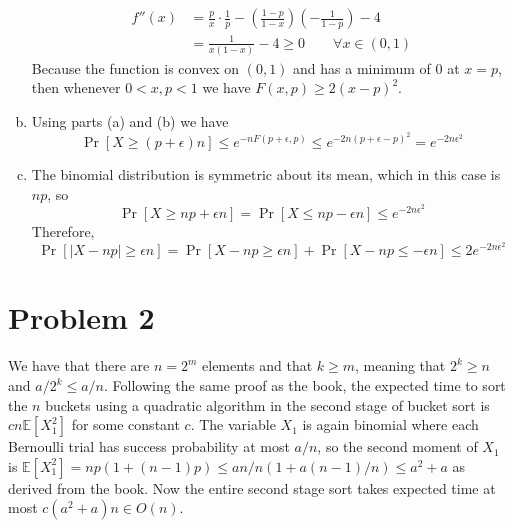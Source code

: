 \documentclass[11pt]{article}
\newcommand{\E}{\mathbb{E}}
\newcommand{\p}[1]{\left(#1\right)}
\newcommand{\BigOh}[1]{O\p{#1}}
\newcommand{\asdf}{\newline\newline}
\begin{document}
\begin{enumerate}[(a)]
\begin{align*}
f''(x) &= \frac px\cdot\frac1p - \left(\frac{1-p}{1-x}\right)\left(-\frac1{1-p}\right) -4\\
&= \frac1{x(1-x)}-4 \geq 0 \qquad \forall x\in (0,1)
\end{align*}
Because the function is convex on $(0,1)$ and has a minimum of $0$ at $x=p$, then whenever $0<x,p<1$ we have $F(x,p)\geq 2(x-p)^2$.
\item Using parts (a) and (b) we have $$\Pr[X\geq (p+\epsilon)n]\leq e^{-nF(p+\epsilon,p)}\leq e^{-2n(p+\epsilon-p)^2} = e^{-2n\epsilon^2}$$
\item The binomial distribution is symmetric about its mean, which in this case is $np$, so $$\Pr[X\geq np+\epsilon n]=\Pr[X\leq np-\epsilon n]\leq e^{-2n\epsilon^2}$$
Therefore, $$\Pr[|X-np|\geq\epsilon n]=\Pr[X-np\geq\epsilon n]+\Pr[X-np\leq -\epsilon n] \leq 2e^{-2n\epsilon^2}$$
\end{enumerate}


\newpage
\section*{Problem 2}
We have that there are $n=2^m$ elements and that $k\geq m$, meaning that $2^k\geq n$ and $a/2^k\leq a/n$. Following the same proof as the book, the expected time to sort the $n$ buckets using a quadratic algorithm in the second stage of bucket sort is $cn\E[X_1^2]$ for some constant $c$.\asdf
The variable $X_1$ is again binomial where each Bernoulli trial has success probability at most $a/n$, so the second moment of $X_1$ is $\E[X_1^2]=np(1+(n-1)p)\leq an/n(1+a(n-1)/n)\leq a^2+a$ as derived from the book. Now the entire second stage sort takes expected time at most $c(a^2+a)n\in \BigOh{n}$.


\newpage
\end{document}
